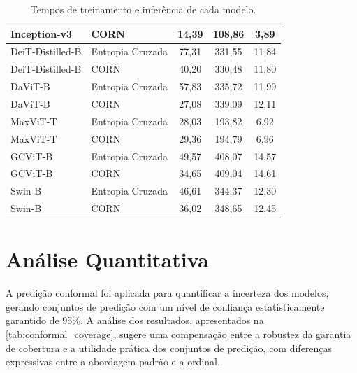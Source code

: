 \begin{table}
\begin{tabular}{|l|l|c|c|c|}
        \hline
        Inception-v3 & CORN & 14,39 & 108,86 & 3,89 \\
        \hline
        DeiT-Distilled-B & Entropia Cruzada & 77,31 & 331,55 & 11,84 \\
        \hline
        DeiT-Distilled-B & CORN & 40,20 & 330,48 & 11,80 \\
        \hline
        DaViT-B & Entropia Cruzada & 57,83 & 335,72 & 11,99 \\
        \hline
        DaViT-B & CORN & 27,08 & 339,09 & 12,11 \\
        \hline
        MaxViT-T & Entropia Cruzada & 28,03 & 193,82 & 6,92 \\
        \hline
        MaxViT-T & CORN & 29,36 & 194,79 & 6,96 \\
        \hline
        GCViT-B & Entropia Cruzada & 49,57 & 408,07 & 14,57 \\
        \hline
        GCViT-B & CORN & 34,65 & 409,04 & 14,61 \\
        \hline
        Swin-B & Entropia Cruzada & 46,61 & 344,37 & 12,30 \\
        \hline
        Swin-B & CORN & 36,02 & 348,65 & 12,45 \\
        \hline
    \end{tabular}
    \caption{Tempos de treinamento e inferência de cada modelo.}
    \label{tab:computational_performance}
\end{table}

\section{Análise Quantitativa}

A predição conformal foi aplicada para quantificar a incerteza dos modelos, gerando conjuntos de predição com um nível de confiança estatisticamente garantido de 95\%. A análise dos resultados, apresentados na \autoref{tab:conformal_coverage}, sugere uma compensação entre a robustez da garantia de cobertura e a utilidade prática dos conjuntos de predição, com diferenças expressivas entre a abordagem padrão e a ordinal.

